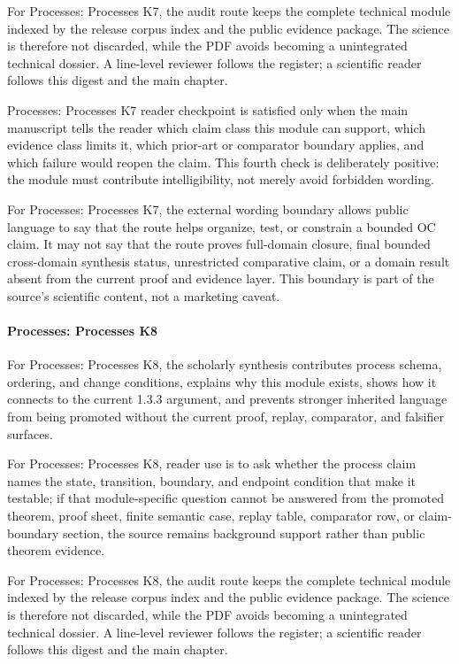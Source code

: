 For Processes: Processes K7, the audit route keeps the complete technical module indexed by the release corpus index and the public evidence package. The science is therefore not discarded, while the PDF avoids becoming a unintegrated technical dossier. A line-level reviewer follows the register; a scientific reader follows this digest and the main chapter.


Processes: Processes K7 reader checkpoint is satisfied only when the main manuscript tells the reader which claim class this module can support, which evidence class limits it, which prior-art or comparator boundary applies, and which failure would reopen the claim. This fourth check is deliberately positive: the module must contribute intelligibility, not merely avoid forbidden wording.


For Processes: Processes K7, the external wording boundary allows public language to say that the route helps organize, test, or constrain a bounded OC claim. It may not say that the route proves full-domain closure, final bounded cross-domain synthesis status, unrestricted comparative claim, or a domain result absent from the current proof and evidence layer. This boundary is part of the source's scientific content, not a marketing caveat.


\paragraph{Processes: Processes K8}

For Processes: Processes K8, the scholarly synthesis contributes process schema, ordering, and change conditions, explains why this module exists, shows how it connects to the current 1.3.3 argument, and prevents stronger inherited language from being promoted without the current proof, replay, comparator, and falsifier surfaces.


For Processes: Processes K8, reader use is to ask whether the process claim names the state, transition, boundary, and endpoint condition that make it testable; if that module-specific question cannot be answered from the promoted theorem, proof sheet, finite semantic case, replay table, comparator row, or claim-boundary section, the source remains background support rather than public theorem evidence.


For Processes: Processes K8, the audit route keeps the complete technical module indexed by the release corpus index and the public evidence package. The science is therefore not discarded, while the PDF avoids becoming a unintegrated technical dossier. A line-level reviewer follows the register; a scientific reader follows this digest and the main chapter.


